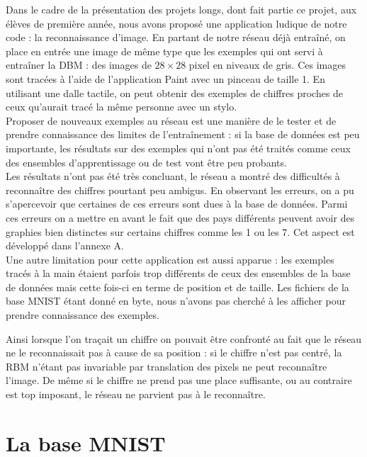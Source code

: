 \documentclass[a4paper,oneside]{report}
\begin{document}
Dans le cadre de la présentation des projets longs, dont fait partie ce projet, aux élèves de première année, nous avons proposé une application ludique de notre code : la reconnaissance d'image. En partant de notre réseau déjà entraîné, on place en entrée une image de même type que les exemples qui ont servi à entraîner la DBM : des images de $28 \times 28$ pixel en niveaux de gris. Ces images sont tracées à l'aide de l'application Paint avec un pinceau de taille 1. En utilisant une dalle tactile, on peut obtenir des exemples de chiffres proches de ceux qu'aurait tracé la même personne avec un stylo.\\
Proposer de nouveaux exemples au réseau est une manière de le tester et de prendre connaissance des limites de l'entraînement : si la base de données est peu importante, les résultats sur des exemples qui n'ont pas été traités comme ceux des ensembles d'apprentissage ou de test vont être peu probants.\\

Les résultats n'ont pas été très concluant, le réseau a montré des difficultés à reconnaître des chiffres pourtant peu ambigus. En observant les erreurs, on a pu s'apercevoir que certaines de ces erreurs sont dues à la base de données. Parmi ces erreurs on a mettre en avant le fait que des pays différents peuvent avoir des graphies bien distinctes sur certains chiffres comme les 1 ou les 7. Cet aspect est développé dans l'annexe A.\\

Une autre limitation pour cette application est aussi apparue : les exemples tracés à la main étaient parfois trop différents de ceux des ensembles de la base de données mais cette fois-ci en terme de position et de taille. Les fichiers de la base MNIST étant donné en byte, nous n'avons pas cherché à les afficher pour prendre connaissance des exemples. 

Ainsi lorsque l'on traçait un chiffre on pouvait être confronté au fait que le réseau ne le reconnaissait pas à cause de sa position : si le chiffre n'est pas centré, la RBM n'étant pas invariable par translation des pixels ne peut reconnaître l'image. De même si le chiffre ne prend pas une place suffisante, ou au contraire est top imposant, le réseau ne parvient pas à le reconnaître.

\nocite{hopfield_neural_1982}
\nocite{*}




    \appendix

    \chapter{La base MNIST}
\end{document}

